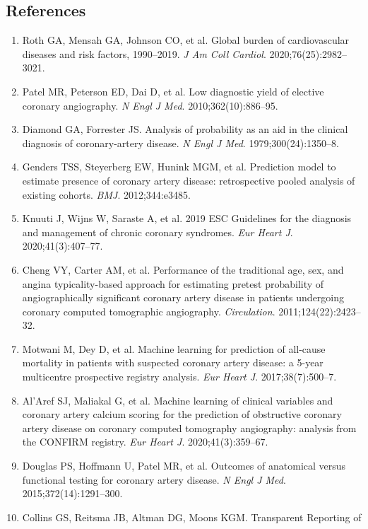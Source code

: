 \documentclass[
  english,
  11pt,
]{article}
\providecommand{\tightlist}{%
  \setlength{\itemsep}{0pt}\setlength{\parskip}{0pt}}
\begin{document}
\subsection{References}\label{references}

\begin{enumerate}
\tightlist
\item
  Roth GA, Mensah GA, Johnson CO, et al. Global burden of cardiovascular
  diseases and risk factors, 1990--2019. \emph{J Am Coll Cardiol}.
  2020;76(25):2982--3021.
\item
  Patel MR, Peterson ED, Dai D, et al. Low diagnostic yield of elective coronary angiography. \emph{N Engl J Med}. 2010;362(10):886--95.
\item
  Diamond GA, Forrester JS. Analysis of probability as an aid in the
  clinical diagnosis of coronary-artery disease. \emph{N Engl J Med}.
  1979;300(24):1350--8.
\item
  Genders TSS, Steyerberg EW, Hunink MGM, et al. Prediction model to
  estimate presence of coronary artery disease: retrospective pooled
  analysis of existing cohorts. \emph{BMJ}. 2012;344:e3485.
\item
  Knuuti J, Wijns W, Saraste A, et al. 2019 ESC Guidelines for the diagnosis and management of chronic coronary syndromes. \emph{Eur Heart J}. 2020;41(3):407--77.
\item
  Cheng VY, Carter AM, et al. Performance of the traditional age, sex, and angina typicality-based approach for estimating pretest probability of angiographically significant coronary artery disease in patients undergoing coronary computed tomographic angiography. \emph{Circulation}. 2011;124(22):2423--32.
\item
  Motwani M, Dey D, et al. Machine learning for prediction of all-cause mortality in patients with suspected coronary artery disease: a 5-year multicentre prospective registry analysis. \emph{Eur Heart J}. 2017;38(7):500--7.
\item
  Al'Aref SJ, Maliakal G, et al. Machine learning of clinical variables and coronary artery calcium scoring for the prediction of obstructive coronary artery disease on coronary computed tomography angiography: analysis from the CONFIRM registry. \emph{Eur Heart J}. 2020;41(3):359--67.
\item
  Douglas PS, Hoffmann U, Patel MR, et al. Outcomes of anatomical versus functional testing for coronary artery disease. \emph{N Engl J Med}. 2015;372(14):1291--300.
\item
  Collins GS, Reitsma JB, Altman DG, Moons KGM. Transparent Reporting of

\end{enumerate}
\end{document}
